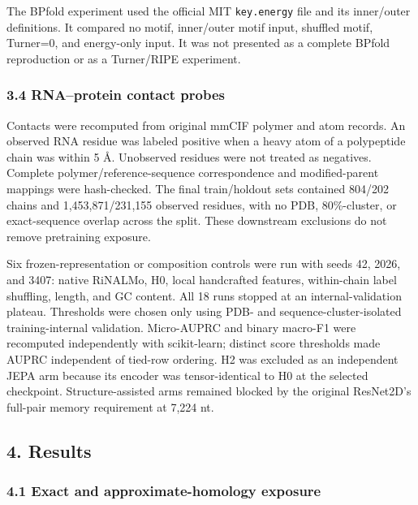 \documentclass[
  11pt]{article}
\begin{document}
The BPfold experiment used the official MIT \texttt{key.energy} file and
its inner/outer definitions. It compared no motif, inner/outer motif
input, shuffled motif, Turner=0, and energy-only input. It was not
presented as a complete BPfold reproduction or as a Turner/RIPE
experiment.

\hypertarget{34-rnaprotein-contact-probes}{%
\subsubsection{3.4 RNA--protein contact
probes}\label{34-rnaprotein-contact-probes}}

Contacts were recomputed from original mmCIF polymer and atom records.
An observed RNA residue was labeled positive when a heavy atom of a
polypeptide chain was within 5 Å. Unobserved residues were not treated
as negatives. Complete polymer/reference-sequence correspondence and
modified-parent mappings were hash-checked. The final train/holdout sets
contained 804/202 chains and 1,453,871/231,155 observed residues, with
no PDB, 80\%-cluster, or exact-sequence overlap across the split. These
downstream exclusions do not remove pretraining exposure.

Six frozen-representation or composition controls were run with seeds
42, 2026, and 3407: native RiNALMo, H0, local handcrafted features,
within-chain label shuffling, length, and GC content. All 18 runs
stopped at an internal-validation plateau. Thresholds were chosen only
using PDB- and sequence-cluster-isolated training-internal validation.
Micro-AUPRC and binary macro-F1 were recomputed independently with
scikit-learn; distinct score thresholds made AUPRC independent of
tied-row ordering. H2 was excluded as an independent JEPA arm because
its encoder was tensor-identical to H0 at the selected checkpoint.
Structure-assisted arms remained blocked by the original ResNet2D's
full-pair memory requirement at 7,224 nt.

\hypertarget{4-results}{%
\subsection{4. Results}\label{4-results}}

\hypertarget{41-exact-and-approximate-homology-exposure}{%
\subsubsection{4.1 Exact and approximate-homology
exposure}\label{41-exact-and-approximate-homology-exposure}}
\end{document}
